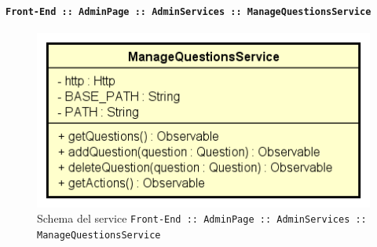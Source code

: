 \documentclass[../DefinizioneDiProdotto_v3.0.0.tex]{subfiles}
\begin{document}
					\newpage
				\paragraph{\texttt{Front-End :: AdminPage :: AdminServices :: ManageQuestionsService}}
				\acapo
				\begin{figure}[!h]
					\centering
					\includegraphics[scale=0.7]{Architettura/Front-End/AdminPage/AdminServices/ManageQuestionsService.png}
					\caption{Schema del service \texttt{Front-End :: AdminPage :: AdminServices :: ManageQuestionsService}}
				\end{figure}
\end{document}
